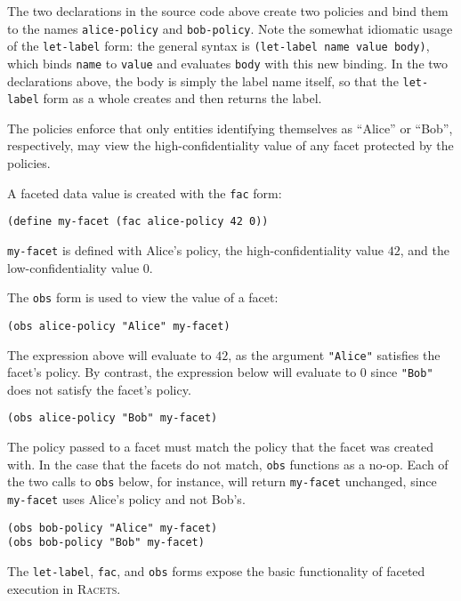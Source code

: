 \documentclass{article}
\begin{document}
The two declarations in the source code above create two policies and bind them to the names \texttt{alice-policy} and \texttt{bob-policy}. Note the somewhat idiomatic usage of the \texttt{let-label} form: the general syntax is \texttt{(let-label name value body)}, which binds \texttt{name} to \texttt{value} and evaluates \texttt{body} with this new binding. In the two declarations above, the body is simply the label name itself, so that the \texttt{let-label} form as a whole creates and then returns the label.

The policies enforce that only entities identifying themselves as ``Alice'' or ``Bob'', respectively, may view the high-confidentiality value of any facet protected by the policies.

A faceted data value is created with the \texttt{fac} form:

\begin{lstlisting}
(define my-facet (fac alice-policy 42 0))
\end{lstlisting}

\texttt{my-facet} is defined with Alice's policy, the high-confidentiality value $42$, and the low-confidentiality value $0$.

The \texttt{obs} form is used to view the value of a facet:

\begin{lstlisting}
(obs alice-policy "Alice" my-facet)
\end{lstlisting}

The expression above will evaluate to $42$, as the argument \texttt{"Alice"} satisfies the facet's policy. By contrast, the expression below will evaluate to $0$ since \texttt{"Bob"} does not satisfy the facet's policy.

\begin{lstlisting}
(obs alice-policy "Bob" my-facet)
\end{lstlisting}

The policy passed to a facet must match the policy that the facet was created with. In the case that the facets do not match, \texttt{obs} functions as a no-op. Each of the two calls to \texttt{obs} below, for instance, will return \texttt{my-facet} unchanged, since \texttt{my-facet} uses Alice's policy and not Bob's.

\begin{lstlisting}
(obs bob-policy "Alice" my-facet)
(obs bob-policy "Bob" my-facet)
\end{lstlisting}

The \texttt{let-label}, \texttt{fac}, and \texttt{obs} forms expose the basic functionality of faceted execution in \textsc{Racets}.
\end{document}
